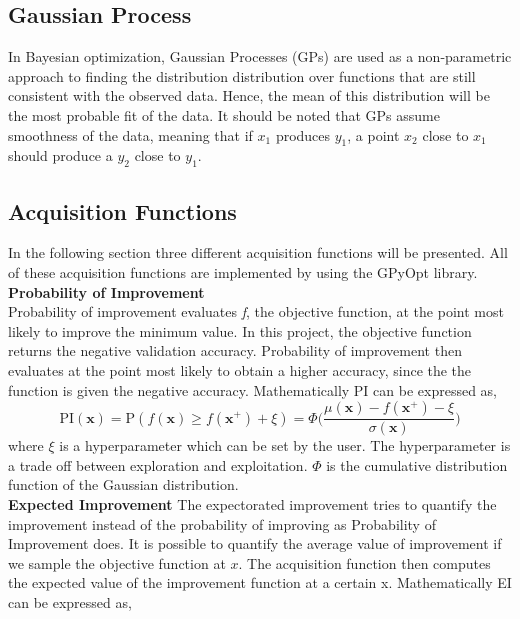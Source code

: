\documentclass[12pt,fleqn]{article}
\begin{document}
\subsection*{Gaussian Process}
In Bayesian optimization, Gaussian Processes (GPs) are used as a non-parametric approach to finding the distribution distribution over functions that are still consistent with the observed data. Hence, the mean of this distribution will be the most probable fit of the data. It should be noted that GPs assume smoothness of the data, meaning that if $x_1$ produces $y_1$, a point $x_2$ close to $x_1$ should produce a $y_2$ close to $y_1$. 

\subsection*{Acquisition Functions}
In the following section three different acquisition functions will be presented. All of these acquisition functions are implemented by using the GPyOpt library. \newline
\noindent\\
\textbf{Probability of Improvement} \\
Probability of improvement evaluates \textit{f}, the objective function, at the point most likely to improve the minimum value. In this project, the objective function returns the negative validation accuracy. Probability of improvement then evaluates at the point most likely to obtain a higher accuracy, since the the function is given the negative accuracy. Mathematically PI can be expressed as,
\begin{equation*}
	\text{PI}(\mathbf{x}) = \text{P}(f(\mathbf{x}) \geq f(\mathbf{x}^+) + \xi) 
	= \Phi\biggl(\frac{\mu(\mathbf{x}) - f(\mathbf{x}^+) - \xi}{\sigma(\mathbf{x})}\biggr)
\end{equation*}
\noindent
where $\xi$ is a hyperparameter which can be set by the user. The hyperparameter is a trade off between exploration and exploitation. $\Phi$ is the cumulative distribution function of the Gaussian distribution.
\newline \\
\textbf{Expected Improvement} \newline 
The expectorated improvement tries to quantify the improvement instead of the probability of improving as Probability of Improvement does. It is possible to quantify the average value of improvement if we sample the objective function at $ x $. The acquisition function then computes the expected value of the improvement function at a certain x. Mathematically EI can be expressed as, 
\end{document}
